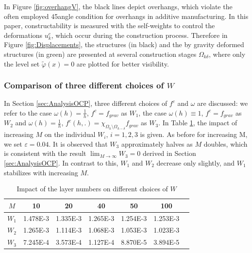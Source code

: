 \documentclass[a4paper,11pt]{article}
\theoremstyle{remark}
\begin{document}
In Figure \ref{fig:overhangV}, the black lines depict overhangs, which violate the
  often employed 45\textdegree  angle condition  for overhangs in additive manufacturing.
 In this paper, constructability is measured with the self-weights to control the deformations 
$u_k^c$,
which occur during the construction process.
Therefore in Figure \ref{fig:Displacements},
the structures (in black) and
the by gravity deformed structures (in green)
are presented at several
construction stages $\Omega_{k\delta }$,
where only the level set $\tilde \varphi (x)=0$
are plotted for better visibility.


\subsubsection{\texorpdfstring{Comparison of three different choices of $W$}{Comparison of three different choices of Fc}}\label{sec:StudyFc}
In Section \ref{sec:AnalysisOCP}, three different choices of $f^c$ and $\omega$ are discussed: we refer to the case $\omega(h)=\frac{1}{h}$, $f^c = f_{grav}$ as $W_1$, the case $\omega(h)\equiv 1$, $f^c = f_{grav}$ as $W_2$ and $\omega(h)= \frac{1}{h}$,
$f^c(h,.) = \chi_{\Omega_h\setminus \Omega_{h-\delta}} f_{grav}$ as $W_3$.
In Table \ref{tab:MDependenceWeighting}, the impact of increasing $M$ on the individual $W_i$, $i=1,2,3$ is given.
As before for increasing M, we set $\varepsilon = 0.04$. 
It is observed that $W_3$ approximately halves as $M$ doubles, which is consistent with the result $\lim_{M\rightarrow\infty} W_3 = 0$ derived in  Section \ref{sec:AnalysisOCP}. In contrast to this, $W_1$ and $W_2$ decrease only slightly, and $W_1$ stabilizes with increasing $M$. 

\begin{table}[ht!]
\centering
\begin{tabular}{|c|c|c|c|c|c|c|}
\hline
\textbf{$M$} & 10 & 20 & 40 & 50 & 100 \\
\hline
\hline
\textbf{$W_1$} & 1.478E-3 & 1.335E-3 & 1.265E-3 & 1.254E-3 & 1.253E-3 \\
\hline
\textbf{$W_2$} & 1.265E-3 & 1.114E-3 & 1.068E-3 & 1.053E-3 & 1.023E-3 \\
\hline
\textbf{$W_3$} & 7.245E-4 & 3.573E-4 & 1.127E-4 & 8.870E-5 & 3.894E-5 \\
\hline
\end{tabular}
\caption{Impact of the layer numbers on different choices of $W$}
\label{tab:MDependenceWeighting}
\end{table}
\end{document}
